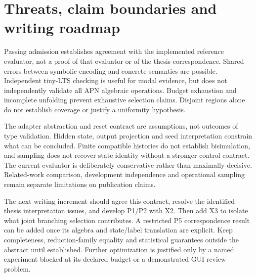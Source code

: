 \section{Threats, claim boundaries and writing roadmap}
Passing admission establishes agreement with the implemented reference evaluator,
not a proof of that evaluator or of the thesis correspondence. Shared errors
between symbolic encoding and concrete semantics are possible. Independent tiny-LTS
checking is useful for modal evidence, but does not independently validate all APN
algebraic operations. Budget exhaustion and incomplete unfolding prevent exhaustive
selection claims. Disjoint regions alone do not establish coverage or justify a
uniformity hypothesis.

The adapter abstraction and reset contract are assumptions, not outcomes of type
validation. Hidden state, output projection and seed interpretation constrain what
can be concluded. Finite compatible histories do not establish bisimulation, and
sampling does not recover state identity without a stronger control contract.
The current evaluator is deliberately conservative rather than maximally decisive.
Related-work comparison, development independence and operational sampling remain
separate limitations on publication claims.

The next writing increment should agree this contract, resolve the identified
thesis interpretation issues, and develop P1/P2 with X2. Then add X3 to isolate
what joint branching selection contributes. A restricted P5 correspondence result
can be added once its algebra and state/label translation are explicit. Keep
completeness, reduction-family equality and statistical guarantees outside the
abstract until established. Further optimization is justified only by a named
experiment blocked at its declared budget or a demonstrated GUI review problem.

